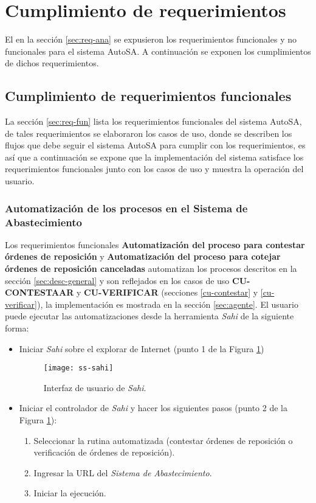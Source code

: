 \section{Cumplimiento de requerimientos}
El en la sección \ref{sec:req-ana} se expusieron los requerimientos funcionales y no funcionales para el sistema AutoSA. A continuación se exponen los cumplimientos de dichos requerimientos.

\subsection{Cumplimiento de requerimientos funcionales}
La sección \ref{sec:req-fun} lista los requerimientos funcionales del sistema AutoSA, de tales requerimientos se elaboraron los casos de uso, donde se describen los flujos que debe seguir el sistema AutoSA para cumplir con los requerimientos, es así que a continuación se expone que la implementación del sistema satisface los requerimientos funcionales junto con los casos de uso y muestra la operación del usuario.

\subsubsection{Automatización de los procesos en el Sistema de Abastecimiento}
Los requerimientos funcionales \textbf{Automatización del proceso para contestar órdenes de reposición} y \textbf{Automatización del proceso para cotejar órdenes de reposición canceladas} automatizan los procesos descritos en la sección \ref{sec:desc-general} y son reflejados en los casos de uso \textbf{CU-CONTESTAAR} y \textbf{CU-VERIFICAR} (secciones \ref{cu-contestar} y \ref{cu-verificar}), la implementación es mostrada en la sección \ref{sec:agente}. El usuario puede ejecutar las automatizaciones desde la herramienta \textit{Sahi} de la siguiente forma:
\begin{itemize}
	\item Iniciar \textit{Sahi} sobre el explorar de Internet (punto 1 de la Figura \ref{fig:ss-sahi})
	\begin{figure}[h]
		\centering
		\texttt{[image: ss-sahi]}
		\caption{Interfaz de usuario de \textit{Sahi}.}
		\label{fig:ss-sahi}
	\end{figure}

	\item Iniciar el controlador de \textit{Sahi} y hacer los siguientes pasos (punto 2 de la Figura \ref{fig:ss-sahi}):
	\begin{enumerate}
		\item Seleccionar la rutina automatizada (contestar órdenes de reposición o verificación de órdenes de reposición).
		\item Ingresar la URL del \textit{Sistema de Abastecimiento}.
		\item Iniciar la ejecución.
	\end{enumerate}
\end{itemize}

